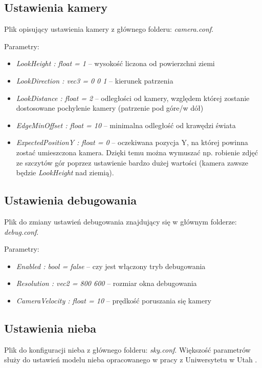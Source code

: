 \documentclass[inz,longabstract]{iithesis}
\begin{document}
        \subsection{Ustawienia kamery}
        Plik opisujący ustawienia kamery z głównego folderu: \textit{camera.conf}.
        
        Parametry:
        \begin{itemize}
            \item \textit{LookHeight : float = 1} -- wysokość liczona od  powierzchni ziemi 
            \item \textit{LookDirection : vec3 = 0 0 1} -- kierunek patrzenia 
            \item \textit{LookDistance : float = 2} -- odległości od kamery, względem której zostanie dostosowane pochylenie kamery (patrzenie pod góre/w dół)
            \item \textit{EdgeMinOffset : float = 10} -- minimalna odległość od krawędzi świata  
            \item \textit{ExpectedPositionY : float = 0} -- oczekiwana pozycja Y, na której powinna zostać umieszczona kamera. Dzięki temu można wymuszać np. robienie zdjęć ze szczytów gór poprzez ustawienie bardzo dużej wartości (kamera zawsze będzie \textit{LookHeight} nad ziemią). 
        \end{itemize}
        
        \subsection{Ustawienia debugowania}
        Plik do zmiany ustawień debugowania znajdujący się w głównym folderze: \textit{debug.conf}.
        
        Parametry:
        \begin{itemize}
            \item \textit{Enabled : bool = false} -- czy jest włączony tryb debugowania
            \item \textit{Resolution : vec2 = 800 600} -- rozmiar okna debugowania
            \item \textit{CameraVelocity : float = 10} -- prędkość poruszania się kamery 
        \end{itemize}
        
        \subsection{Ustawienia nieba}
        Plik do konfiguracji nieba z głównego folderu: \textit{sky.conf}. Większość parametrów służy do ustawień modelu nieba opracowanego w pracy z Uniwersytetu w Utah \cite{sky}.
        
\end{document}
